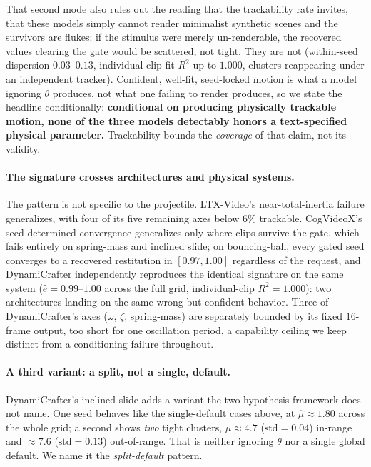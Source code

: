 \documentclass[10pt,twocolumn,letterpaper]{article}
\begin{document}
That second mode also rules out the reading that the trackability rate
invites, that these models simply cannot render minimalist synthetic
scenes and the survivors are flukes: if the stimulus were merely
un-renderable, the recovered values clearing the gate would be scattered,
not tight. They are not (within-seed dispersion $0.03$--$0.13$,
individual-clip fit $R^2$ up to $1.000$, clusters reappearing under an
independent tracker). Confident, well-fit, seed-locked motion is what a
model ignoring $\theta$ produces, not what one failing to render produces,
so we state the headline conditionally: \textbf{conditional on producing
physically trackable motion, none of the three models detectably honors a
text-specified physical parameter.} Trackability bounds the
\emph{coverage} of that claim, not its validity.

\paragraph{The signature crosses architectures and physical systems.}
The pattern is not specific to the projectile. LTX-Video's near-total-inertia
failure generalizes, with four of its five remaining axes below $6\%$
trackable. CogVideoX's seed-determined convergence generalizes only where
clips survive the gate, which fails entirely on spring-mass and inclined
slide; on bouncing-ball, every gated seed converges to a recovered
restitution in $[0.97,1.00]$ regardless of the request, and DynamiCrafter
independently reproduces the identical signature on the same system
($\hat e = 0.99$--$1.00$ across the full grid, individual-clip
$R^2=1.000$): two architectures landing on the same wrong-but-confident
behavior. Three of DynamiCrafter's axes ($\omega$, $\zeta$, spring-mass)
are separately bounded by its fixed $16$-frame output, too short for one
oscillation period, a capability ceiling we keep distinct from a
conditioning failure throughout.

\paragraph{A third variant: a split, not a single, default.}
DynamiCrafter's inclined slide adds a variant the two-hypothesis framework
does not name. One seed behaves like the single-default cases above, at
$\hat\mu\approx1.80$ across the whole grid; a second shows \emph{two} tight
clusters, $\hat\mu\approx4.7$ ($\mathrm{std}=0.04$) in-range and $\approx7.6$
($\mathrm{std}=0.13$) out-of-range. That is neither ignoring $\theta$ nor a
single global default. We name it the \emph{split-default} pattern.
\end{document}
